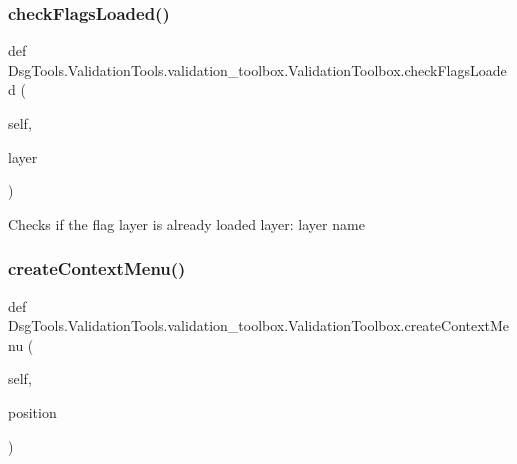 \subsubsection{\texorpdfstring{check\+Flags\+Loaded()}{checkFlagsLoaded()}}
{\footnotesize\ttfamily def Dsg\+Tools.\+Validation\+Tools.\+validation\+\_\+toolbox.\+Validation\+Toolbox.\+check\+Flags\+Loaded (\begin{DoxyParamCaption}\item[{}]{self,  }\item[{}]{layer }\end{DoxyParamCaption})}

\begin{DoxyVerb}Checks if the flag layer is already loaded
layer: layer name
\end{DoxyVerb}
 \mbox{\label{class_dsg_tools_1_1_validation_tools_1_1validation__toolbox_1_1_validation_toolbox_a6957567427f23a92c28e7c1aa93a0aa2}} 
\subsubsection{\texorpdfstring{create\+Context\+Menu()}{createContextMenu()}}
{\footnotesize\ttfamily def Dsg\+Tools.\+Validation\+Tools.\+validation\+\_\+toolbox.\+Validation\+Toolbox.\+create\+Context\+Menu (\begin{DoxyParamCaption}\item[{}]{self,  }\item[{}]{position }\end{DoxyParamCaption})}

